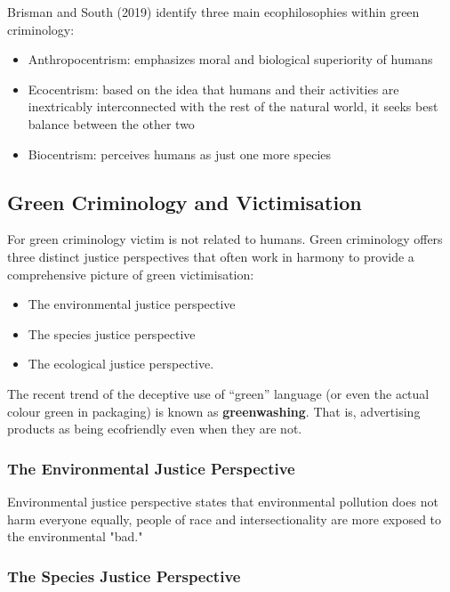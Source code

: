 \documentclass{article}
\begin{document}
Brisman and South (2019) identify three main ecophilosophies within green criminology:

\begin{itemize}
    \item Anthropocentrism: emphasizes  moral and biological superiority of humans
    \item Ecocentrism: based on the idea that humans and their activities are inextricably interconnected with the rest of the natural world, it seeks best balance between the other two
    \item Biocentrism: perceives humans as just one more species
\end{itemize}

\subsection{Green Criminology and Victimisation}

For green criminology victim is not related to humans. Green criminology offers three distinct justice perspectives that often work in harmony to provide a comprehensive picture of green victimisation:

\begin{itemize}
    \item The environmental justice perspective
    \item The species justice perspective
    \item The ecological justice perspective.
\end{itemize}

The recent trend of the deceptive use of “green” language (or even the actual colour green in packaging) is known as \textbf{greenwashing}. That is, advertising products as being ecofriendly even when they are not. 

\subsubsection*{The Environmental Justice Perspective}

Environmental justice perspective states that environmental pollution does not harm everyone equally, people of race and intersectionality are more exposed to the environmental "bad."

\subsubsection*{The Species Justice Perspective}
\end{document}

